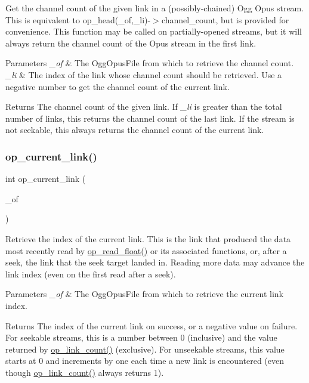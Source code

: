 Get the channel count of the given link in a (possibly-\/chained) Ogg Opus stream. This is equivalent to {\ttfamily op\+\_\+head(\+\_\+of,\+\_\+li)-\/$>$channel\+\_\+count}, but is provided for convenience. This function may be called on partially-\/opened streams, but it will always return the channel count of the Opus stream in the first link. 
\begin{DoxyParams}{Parameters}
{\em \+\_\+of} & The {\ttfamily Ogg\+Opus\+File} from which to retrieve the channel count. \\
\hline
{\em \+\_\+li} & The index of the link whose channel count should be retrieved. Use a negative number to get the channel count of the current link. \\
\hline
\end{DoxyParams}
\begin{DoxyReturn}{Returns}
The channel count of the given link. If {\itshape \+\_\+li} is greater than the total number of links, this returns the channel count of the last link. If the stream is not seekable, this always returns the channel count of the current link. 
\end{DoxyReturn}
\mbox{\label{group__stream__info_gabd97a260a6740ea7c2c59ca9ecd592bf}} 
\subsubsection{\texorpdfstring{op\_current\_link()}{op\_current\_link()}}
{\footnotesize\ttfamily int op\+\_\+current\+\_\+link (\begin{DoxyParamCaption}\item[{const Ogg\+Opus\+File $\ast$}]{\+\_\+of }\end{DoxyParamCaption})}

Retrieve the index of the current link. This is the link that produced the data most recently read by \mbox{\hyperlink{group__stream__decoding_ga73493002d84a234f5e19b70f1dddbe2a}{op\+\_\+read\+\_\+float()}} or its associated functions, or, after a seek, the link that the seek target landed in. Reading more data may advance the link index (even on the first read after a seek). 
\begin{DoxyParams}{Parameters}
{\em \+\_\+of} & The {\ttfamily Ogg\+Opus\+File} from which to retrieve the current link index. \\
\hline
\end{DoxyParams}
\begin{DoxyReturn}{Returns}
The index of the current link on success, or a negative value on failure. For seekable streams, this is a number between 0 (inclusive) and the value returned by \mbox{\hyperlink{group__stream__info_gaaf6ff40725a8bc7e73c9d396ab91837d}{op\+\_\+link\+\_\+count()}} (exclusive). For unseekable streams, this value starts at 0 and increments by one each time a new link is encountered (even though \mbox{\hyperlink{group__stream__info_gaaf6ff40725a8bc7e73c9d396ab91837d}{op\+\_\+link\+\_\+count()}} always returns 1). 
\end{DoxyReturn}

